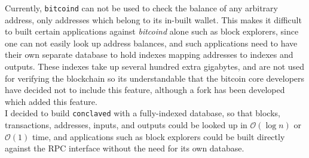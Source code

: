 \documentclass{report}
\begin{document}
	Currently, \texttt{bitcoind} can not be used to check the balance of any arbitrary address, only addresses which belong to its in-built wallet. This makes it difficult to built certain applications against \textit{bitcoind} alone such as block explorers,  since one can not easily look up address balances, and such applications need to have their own separate database to hold indexes mapping addresses to indexes and outputs. These indexes take up several hundred extra gigabytes, and are not used for verifying the blockchain so its understandable that the bitcoin core developers have decided not to include this feature, although a fork  \cite{addressindex} has been developed which added this feature. \\
	
	I decided to build \texttt{conclaved} with a fully-indexed database, so that blocks, transactions, addresses, inputs, and outputs could be looked up in $\mathcal{O}(\log{}n)$ or $\mathcal{O}(1)$ time, and applications such as block explorers could be built directly against the RPC interface without the need for its own database. 
\end{document}
